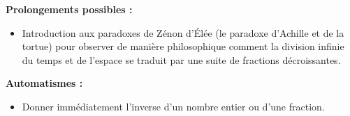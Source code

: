 \documentclass[11pt,a4paper]{article}
\begin{document}
\textbf{Prolongements possibles :}
\begin{itemize}
    \item Introduction aux paradoxes de Zénon d'Élée (le paradoxe d'Achille et de la tortue) pour observer de manière philosophique comment la division infinie du temps et de l'espace se traduit par une suite de fractions décroissantes.
\end{itemize}

\textbf{Automatismes :}
\begin{itemize}
    \item Donner immédiatement l'inverse d'un nombre entier ou d'une fraction.
\end{itemize}
\end{document}
